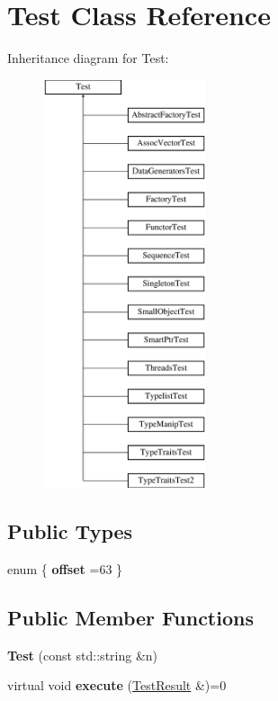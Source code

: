 \hypertarget{classTest}{}\section{Test Class Reference}
\label{classTest}
Inheritance diagram for Test\+:\begin{figure}[H]
\begin{center}
\leavevmode
\includegraphics[height=12.000000cm]{classTest}
\end{center}
\end{figure}
\subsection*{Public Types}
\begin{DoxyCompactItemize}
\item 
\hypertarget{classTest_a5a0ded8b959e6b15e4bef86875e3d4ac}{}enum \{ {\bfseries offset} =63
 \}\label{classTest_a5a0ded8b959e6b15e4bef86875e3d4ac}

\end{DoxyCompactItemize}
\subsection*{Public Member Functions}
\begin{DoxyCompactItemize}
\item 
\hypertarget{classTest_a27471c589a5f1c0602381d91def16803}{}{\bfseries Test} (const std\+::string \&n)\label{classTest_a27471c589a5f1c0602381d91def16803}

\item 
\hypertarget{classTest_af74617e651bfae491f86d50f4cd08e8c}{}virtual void {\bfseries execute} (\hyperlink{classTestResult}{Test\+Result} \&)=0\label{classTest_af74617e651bfae491f86d50f4cd08e8c}

\end{DoxyCompactItemize}
